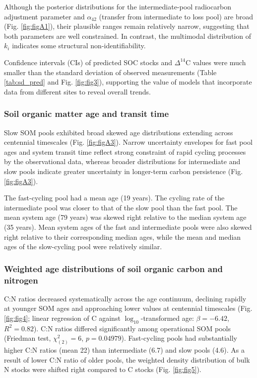 \documentclass[bg, manuscript]{copernicus}
\begin{document}
Although the posterior distributions for the intermediate-pool radiocarbon adjustment parameter and $\alpha_{42}$ (transfer from intermediate to loss pool) are broad (Fig. \ref{fig:figA1}), their plausible ranges remain relatively narrow, suggesting that both parameters are well constrained. In contrast, the multimodal distribution of $k_i$ indicates some structural non-identifiability.

Confidence intervals (CIs) of predicted SOC stocks and $\Delta^{14}\text{C}$ values were much smaller than the standard deviation of observed measurements (Table \ref{tab:sd_pred} and Fig. \ref{fig:fig3}), supporting the value of models that incorporate data from different sites to reveal overall trends.

\subsubsection{Soil organic matter age and transit time}
Slow SOM pools exhibited broad skewed age distributions extending across centennial timescales (Fig. \ref{fig:figA3}). Narrow uncertainty envelopes for fast pool ages and system transit time reflect strong constraint of rapid cycling processes by the observational data, whereas broader distributions for intermediate and slow pools indicate greater uncertainty in longer-term carbon persistence (Fig. \ref{fig:figA3}).

The fast-cycling pool had a mean age (19 years). The cycling rate of the intermediate pool was closer to that of the slow pool than the fast pool. The mean system age (79 years) was skewed right relative to the median system age (35 years). Mean system ages of the fast and intermediate pools were also skewed right relative to their corresponding median ages, while the mean and median ages of the slow-cycling pool were relatively similar.

\subsubsection{Weighted age distributions of soil organic carbon and nitrogen}
C:N ratios decreased systematically across the age continuum, declining rapidly at younger SOM ages and approaching lower values at centennial timescales (Fig. \ref{fig:fig4}; linear regression of C against $\log_{10}$-transformed age: $\beta = -6.42$, $R^2 = 0.82$). C:N ratios differed significantly among operational SOM pools (Friedman test, $\chi^2_{(2)} = 6$, $p = 0.04979$). Fast-cycling pools had substantially higher C:N ratios (mean 22) than intermediate (6.7) and slow pools (4.6). As a result of lower C:N ratio of older pools, the weighted density distribution of bulk N stocks were shifted right compared to C stocks (Fig. \ref{fig:fig5}).
\end{document}
